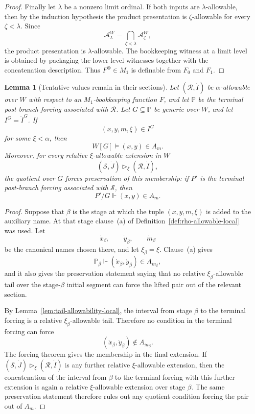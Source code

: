 \documentclass[a4paper,11pt]{article}
\newtheorem{lemma}[theorem]{Lemma}
\begin{document}
\begin{proof}
Finally let \(\lambda\) be a nonzero limit ordinal.  If both inputs are
\(\lambda\)-allowable, then by the induction hypothesis the product
presentation is \(\zeta\)-allowable for every \(\zeta<\lambda\).  Since
\[
   \mathcal A^W_\lambda
   =
   \bigcap_{\zeta<\lambda}\mathcal A^W_\zeta,
\]
the product presentation is \(\lambda\)-allowable.  The bookkeeping witness at
a limit level is obtained by packaging the lower-level witnesses together with
the concatenation description.  Thus \(F^\otimes\in M_1\) is definable from
\(F_0\) and \(F_1\).
\end{proof}

\begin{lemma}[Tentative values remain in their sections]
\label{lem:tentative-values-remain-local}
Let \((\mathcal R,\dot I)\) be \(\alpha\)-allowable over \(W\) with respect to an
\(M_1\)-bookkeeping function \(F\), and let \(\mathbb P\) be the terminal
post-branch forcing associated with \(\mathcal R\).
Let \(G\subseteq\mathbb P\) be generic over \(W\), and let
\(I^G=\dot I^G\).  If
\[
   (x,y,m,\xi)\in I^G
\]
for some \(\xi<\alpha\), then
\[
   W[G]\models (x,y)\in A_m.
\]
Moreover, for every relative \(\xi\)-allowable extension in \(W\)
\[
   (\mathcal S,\dot J)\triangleright_\xi(\mathcal R,\dot I),
\]
the quotient over \(G\) forces preservation of this membership: if \(P'\) is the
terminal post-branch forcing associated with \(\mathcal S\), then
\[
   P'/G\Vdash (x,y)\in A_m.
\]
\end{lemma}

\begin{proof}
Suppose that \(\beta\) is the stage at which the tuple
\((x,y,m,\xi)\) is added to the auxiliary name.  At that stage clause~(a) of
Definition~\ref{def:rho-allowable-local} was used.  Let
\[
   \dot x_\beta,\qquad
   \dot y_\beta,\qquad
   \dot m_\beta
\]
be the canonical names chosen there, and let \(\xi_\beta=\xi\).  Clause~(a)
gives
\[
   \mathbb P_\beta\Vdash
   (\dot x_\beta,\dot y_\beta)\in A_{\dot m_\beta},
\]
and it also gives the preservation statement saying that no relative
\(\xi_\beta\)-allowable tail over the stage-\(\beta\) initial segment can force
the lifted pair out of the relevant section.

By Lemma~\ref{lem:tail-allowability-local}, the interval from stage \(\beta\)
to the terminal forcing is a relative \(\xi_\beta\)-allowable tail.  Therefore
no condition in the terminal forcing can force
\[
   (\dot x_\beta,\dot y_\beta)\notin A_{\dot m_\beta}.
\]
The forcing theorem gives the membership in the final extension.  If
\((\mathcal S,\dot J)\triangleright_\xi(\mathcal R,\dot I)\) is any further relative
\(\xi\)-allowable extension, then the concatenation of the interval from
\(\beta\) to the terminal forcing with this further extension is again a
relative \(\xi\)-allowable extension over stage \(\beta\).  The same
preservation statement therefore rules out any quotient condition forcing the
pair out of \(A_m\).
\end{proof}
\end{document}
